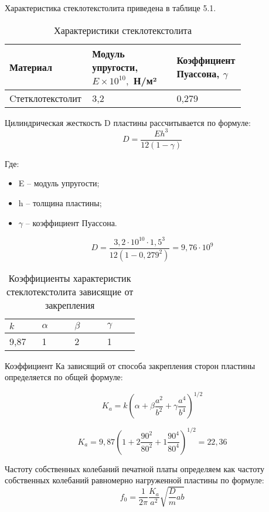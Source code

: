 Характеристика стеклотекстолита приведена в таблице 5.1.

\begin{table}[H]
  \caption{Характеристики стеклотекстолита}
  \centering
  \begin{tabular}{|p{0.25\linewidth} | p{0.35\linewidth}| p{0.2\linewidth} |}
    \hline
    Материал & Модуль упругости, $E \times 10^{10},$ Н/м²& Коэффициент Пуассона, $\gamma$ \\
    \hline
    Cтетклотекстолит & 3,2 & 0,279 \\
    \hline
  \end{tabular}
\end{table}

Цилиндрическая жесткость D пластины рассчитывается по формуле:
\begin{equation}
  D = \frac{Eh^3}{12(1 - \gamma)}
\end{equation}

Где:
\begin{itemize}
\item E – модуль упругости;
\item h – толщина пластины;
\item $\gamma$ – коэффициент Пуассона.
\end{itemize}

$$D = \frac{3,2 \cdot 10^{10} \cdot 1,5^{3}}{12(1 - 0,279^2)}=9,76 \cdot 10^9$$

\begin{table}[H]
  \caption{Коэффициенты характеристик стеклотекстолита зависящие от закрепления}
  \centering
  \begin{tabular}{|p{0.2\linewidth}| p{0.2\linewidth} | p{0.2\linewidth}| p{0.2\linewidth}|}
    \hline
    $k$ & $\alpha$ & $\beta$ & $\gamma$ \\
    \hline
    9,87 & 1 & 2 & 1 \\
    \hline
  \end{tabular}
\end{table}

Коэффициент $Ка$ зависящий от способа закрепления сторон пластины
определяется по общей формуле:

\begin{equation}
  K_a=k\left(\alpha + \beta \frac{a^2}{b^2} + \gamma\frac{a^4}{b^4}\right)^{1/2}
\end{equation}

$$K_a=9,87 \left(1 +2\frac{90^2}{80^2} + 1\frac{90^4}{80^4}\right)^{1/2}=22,36$$

Частоту собственных колебаний печатной платы определяем как частоту
собственных колебаний равномерно нагруженной пластины по формуле:
\begin{equation}
  f_0= \frac{1}{2\pi}\frac{K_a}{a^2}\sqrt{\frac{D}{m} ab}
\end{equation}


